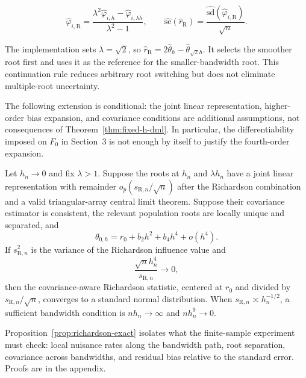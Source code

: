\begin{equation}
\widehat\varphi_{i,\mathrm R}
=\frac{\lambda^2\widehat\varphi_{i,h}-
\widehat\varphi_{i,\lambda h}}{\lambda^2-1},
\qquad
\widehat{\mathrm{se}}(\widehat r_{\mathrm R})
=\frac{\widehat{\mathrm{sd}}(\widehat\varphi_{i,\mathrm R})}{\sqrt n}.
\end{equation}

The implementation sets $\lambda=\sqrt{2}$, so
$\widehat r_{\mathrm R}=2\widehat\theta_h-
\widehat\theta_{\sqrt{2}h}$. It selects the smoother root first and uses it as
the reference for the smaller-bandwidth root. This continuation rule reduces
arbitrary root switching but does not eliminate multiple-root uncertainty.

The following extension is conditional: the joint linear representation,
higher-order bias expansion, and covariance conditions are additional
assumptions, not consequences of Theorem~\ref{thm:fixed-h-dml}. In particular,
the differentiability imposed on $F_0$ in Section~3 is not enough by itself to
justify the fourth-order expansion.

\begin{proposition}
\label{prop:richardson-exact}
Let $h_n\to0$ and fix $\lambda>1$. Suppose the roots at $h_n$ and
$\lambda h_n$ have a joint linear representation with remainder
$o_p(s_{\mathrm R,n}/\sqrt n)$ after the Richardson combination and a valid
triangular-array central limit theorem. Suppose their covariance estimator is
consistent, the relevant population roots are locally unique and separated,
and
\begin{equation}
\theta_{0,h}=r_0+b_2h^2+b_4h^4+o(h^4).
\end{equation}
If $s_{\mathrm R,n}^2$ is the variance of the Richardson influence value and
\begin{equation}
\frac{\sqrt n h_n^4}{s_{\mathrm R,n}}\to0,
\label{eq:richardson-rate}
\end{equation}
then the covariance-aware Richardson statistic, centered at $r_0$ and divided
by $s_{\mathrm R,n}/\sqrt n$, converges to a standard normal distribution.
When $s_{\mathrm R,n}\asymp h_n^{-1/2}$, a sufficient bandwidth condition is
$nh_n\to\infty$ and $nh_n^9\to0$.
\end{proposition}

Proposition~\ref{prop:richardson-exact} isolates what the finite-sample
experiment must check: local nuisance rates along the bandwidth path, root
separation, covariance across bandwidths, and residual bias relative to the
standard error. Proofs are in the appendix.

